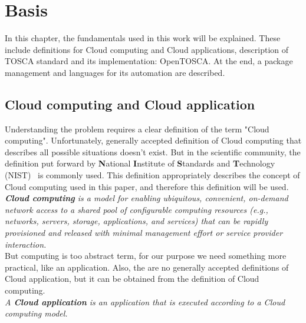 
\chapter{Basis}
\label{chap:basis}
In this chapter, the fundamentals used in this work will be explained.
These include definitions for Cloud computing and Cloud applications, description of TOSCA standard and its implementation: OpenTOSCA.
At the end, a package management and languages for its automation are described.
\section{Cloud computing and Cloud application} \label{sec:cloud}
Understanding the problem requires a clear definition of the term "Cloud computing".
Unfortunately, generally accepted definition of Cloud computing that describes all possible situations doesn't exist. 
But in the scientific community, the definition put forward by \textbf{N}ational \textbf{I}nstitute of \textbf{S}tandards and \textbf{T}echnology (NIST)~\cite*{wwwnist} is commonly used. 
This definition appropriately describes the concept of Cloud computing used in this paper, and therefore this definition will be used.\\
\emph{\textbf{Cloud computing}\label{def:nist} is a model for enabling ubiquitous, convenient, on-demand network access to a shared pool of configurable computing resources (e.g., networks, servers, storage, applications, and services) that can be rapidly provisioned and released with minimal management effort or service provider interaction.}~\cite*{nist}\\
But computing is too abstract term, for our purpose we need something more practical, like an application.
Also, the are no generally accepted definitions of Cloud application, but it can be obtained from the definition of Cloud computing.\\
\emph{A \textbf{Cloud application}\label{def:capp} is an application that is executed according to a Cloud computing model.} \\%
